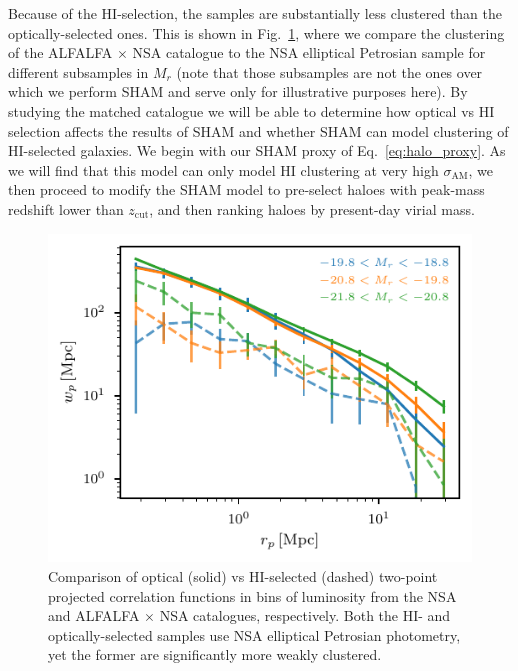 \documentclass[usenatbib,useAMS]{mnras}
\newcommand{\zcut}{\ensuremath{z_{\mathrm{cut}}}}
\newcommand{\HI}{\ensuremath{\mathrm{H}\scriptstyle\mathrm{I}}}
\newcommand{\scatter}{\ensuremath{\sigma_{\mathrm{AM}}}}
\newcommand{\matched}{ALFALFA $\times$ NSA }
\begin{document}
Because of the $\HI$-selection, the samples are substantially less clustered than the optically-selected ones. This is shown in Fig.~\ref{fig:HI2opt_clustering}, where we compare the clustering of the \matched catalogue to the NSA elliptical Petrosian sample for different subsamples in $M_r$ (note that those subsamples are not the ones over which we perform \ac{SHAM} and serve only for illustrative purposes here). By studying the matched catalogue we will be able to determine how optical vs $\HI$ selection affects the results of \ac{SHAM} and whether \ac{SHAM} can model clustering of $\HI$-selected galaxies.
We begin with our \ac{SHAM} proxy of Eq.~\eqref{eq:halo_proxy}. As we will find that this model can only model $\HI$ clustering at very high $\scatter$, we then proceed to modify the \ac{SHAM} model to pre-select haloes with peak-mass redshift lower than $\zcut$, and then ranking haloes by present-day virial mass.

\begin{figure}
    \centering
    \includegraphics[width=1.0\columnwidth]{Figures/clustering_HI2optical.pdf}
    \caption{Comparison of optical (solid) vs $\HI$-selected (dashed) two-point projected correlation functions in bins of luminosity from the \ac{NSA} and \matched catalogues, respectively. Both the $\HI$- and optically-selected samples use \ac{NSA} elliptical Petrosian photometry, yet the former are significantly more weakly clustered.}
    \label{fig:HI2opt_clustering}
\end{figure}
\end{document}
